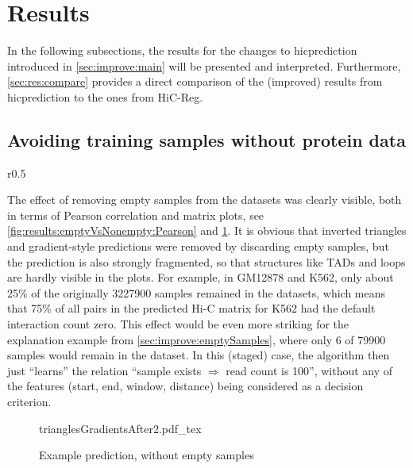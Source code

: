 \section{Results} \label{sec:results:main}
In the following subsections, the results for the changes to hicprediction introduced in 
\autoref{sec:improve:main} will be presented and interpreted. 
Furthermore, \autoref{sec:res:compare} provides a direct comparison 
of the (improved) results from hicprediction to the ones from HiC-Reg.

\subsection{Avoiding training samples without protein data} \label{sec:res:removeEmptySamples}
\begin{wrapfigure}{r}{0.5\textwidth}
 \centering
 \caption{Pearson correlation before/after removing samples}
 \label{fig:results:emptyVsNonempty:Pearson}
\end{wrapfigure}
The effect of removing empty samples from the datasets was clearly visible,
both in terms of Pearson correlation and matrix plots, 
see \autoref{fig:results:emptyVsNonempty:Pearson} and \ref{fig:results:pk:noEmpty:5k}.
It is obvious that inverted triangles and gradient-style predictions were removed by discarding empty samples,
but the prediction is also strongly fragmented, so that structures like TADs and loops are hardly visible in the plots.
For example, in GM12878 and K562, only about 25\% of the originally \num{3227900} samples remained in the datasets,
which means that 75\% of all pairs in the predicted Hi-C matrix for K562 had the default interaction count zero.
This effect would be even more striking for the explanation example from \autoref{sec:improve:emptySamples},
where only 6 of \num{79900} samples would remain in the dataset. 
In this (staged) case, the algorithm then just ``learns'' the relation 
``sample exists $\Rightarrow$ read count is 100'',
without any of the features (start, end, window, distance) being considered as a decision criterion.
\begin{figure}[h]
 \centering
 \scriptsize
 {trianglesGradientsAfter2.pdf_tex}
 \caption{Example prediction, without empty samples}
 \label{fig:results:pk:noEmpty:5k}
\end{figure}

